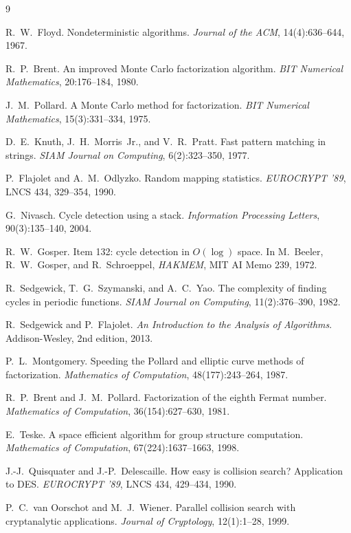 \documentclass[11pt]{ctexart}
\begin{document}
\begin{thebibliography}{9}

 R.~W.~Floyd. Nondeterministic algorithms.
\emph{Journal of the ACM}, 14(4):636--644, 1967.

 R.~P.~Brent. An improved Monte Carlo factorization algorithm.
\emph{BIT Numerical Mathematics}, 20:176--184, 1980.

 J.~M.~Pollard. A Monte Carlo method for factorization.
\emph{BIT Numerical Mathematics}, 15(3):331--334, 1975.

 D.~E.~Knuth, J.~H.~Morris~Jr., and V.~R.~Pratt. Fast pattern
matching in strings. \emph{SIAM Journal on Computing}, 6(2):323--350, 1977.

 P.~Flajolet and A.~M.~Odlyzko. Random mapping statistics.
\emph{EUROCRYPT '89}, LNCS 434, 329--354, 1990.

 G.~Nivasch. Cycle detection using a stack.
\emph{Information Processing Letters}, 90(3):135--140, 2004.

 R.~W.~Gosper. Item 132: cycle detection in $O(\log)$ space.
In M.~Beeler, R.~W.~Gosper, and R.~Schroeppel, \emph{HAKMEM}, MIT AI Memo 239, 1972.

 R.~Sedgewick, T.~G.~Szymanski, and A.~C.~Yao. The complexity of
finding cycles in periodic functions. \emph{SIAM Journal on Computing},
11(2):376--390, 1982.

 R.~Sedgewick and P.~Flajolet. \emph{An Introduction to
the Analysis of Algorithms}. Addison-Wesley, 2nd edition, 2013.

 P.~L.~Montgomery. Speeding the Pollard and elliptic
curve methods of factorization. \emph{Mathematics of Computation},
48(177):243--264, 1987.

 R.~P.~Brent and J.~M.~Pollard. Factorization of the eighth
Fermat number. \emph{Mathematics of Computation}, 36(154):627--630, 1981.

 E.~Teske. A space efficient algorithm for group structure
computation. \emph{Mathematics of Computation}, 67(224):1637--1663, 1998.

 J.-J.~Quisquater and J.-P.~Delescaille. How easy is collision
search? Application to DES. \emph{EUROCRYPT '89}, LNCS 434, 429--434, 1990.

 P.~C.~van Oorschot and M.~J.~Wiener. Parallel collision search
with cryptanalytic applications. \emph{Journal of Cryptology}, 12(1):1--28, 1999.

\end{thebibliography}
\end{document}
